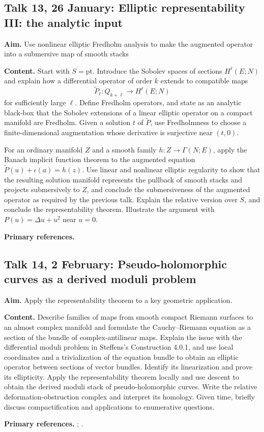 \documentclass[11pt,a4paper]{article}
\newcommand{\Talk}[6]{%
  \subsection*{Talk #1, #2: #3}
  \textbf{Aim.} #4

  \textbf{Content.} #5

  \textbf{Primary references.} #6
  \par\medskip
}
\begin{document}
\Talk{13}{26 January}{Elliptic representability III: the analytic input}
{Use nonlinear elliptic Fredholm analysis to make the augmented operator into a submersive map of smooth stacks}
{Start with $S = \mathrm{pt}$. Introduce the Sobolev spaces of sections $H^{\ell}(E;N)$ and explain how a differential operator of order $k$ extends to compatible maps
\[
	\widetilde{P}_\ell\colon Q_{k+\ell}\longrightarrow H^\ell(E;N)
\]
for sufficiently large $\ell$. Define Fredholm operators, and state as an analytic black-box that the Sobolev extensions of a linear elliptic operator on a compact manifold are Fredholm. Given a solution $t$ of $\widetilde P$, use Fredholmness to choose a finite-dimensional augmentation whose derivative is surjective near $(t,0)$.

For an ordinary manifold $Z$ and a smooth family $h\colon Z\to\Gamma(N;E)$, apply the Banach implicit function theorem to the augmented equation $\widetilde P(u)+\iota(a)=h(z)$. Use linear and nonlinear elliptic regularity to show that the resulting solution manifold represents the pullback of smooth stacks and projects submersively to $Z$, and conclude the submersiveness of the augmented operator as required by the previous talk. Explain the relative version over $S$, and conclude the representability theorem. Illustrate the argument with $P(u)=\Delta u+u^2$ near $u=0$.}
{\textcite[Lemmas~3.4.5--3.4.6, the analytic part of the proof of
	Theorem~3.4.3]{Steffens_Representability_Elliptic_Moduli}}

\Talk{14}{2 February}{Pseudo-holomorphic curves as a derived moduli problem}
{Apply the representability theorem to a key geometric application.}
{Describe families of maps from smooth compact Riemann surfaces to an almost complex manifold and formulate the Cauchy--Riemann equation as a section of the bundle of complex-antilinear maps. Explain the issue with the differential moduli problem in Steffens's Construction 4.0.1, and use local coordinates and a trivialization of the equation bundle to obtain an elliptic operator between sections of vector bundles. Identify its linearization and prove its ellipticity. Apply the representability theorem locally and use descent to obtain the derived moduli stack of pseudo-holomorphic curves. Write the relative deformation-obstruction complex and interpret its homology. Given time, briefly discuss compactification and applications to enumerative questions.}
{\textcite[Sections~2.1, 2.3--2.4, and
3.3--3.4]{Wendl_Lectures_Holomorphic_Curves};
\textcite[Section~4]{Steffens_Representability_Elliptic_Moduli}.}

\printbibliography[title={References}]
\end{document}
